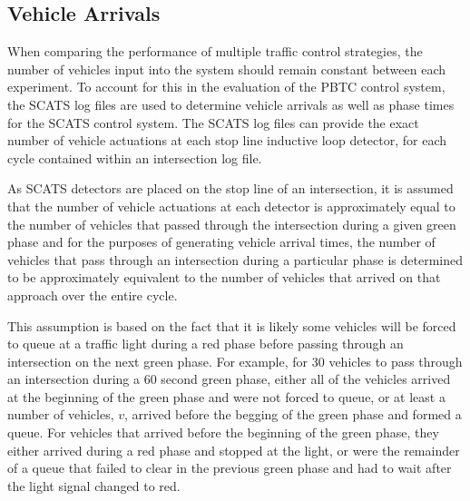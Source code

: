 
\subsection{Vehicle Arrivals}


When comparing the performance of multiple traffic control strategies, the number of vehicles input into the system should remain constant between each experiment. To account for this in the evaluation of the PBTC control system, the SCATS log files are used to determine vehicle arrivals as well as phase times for the SCATS control system. The SCATS log files can provide the exact number of vehicle actuations at each stop line inductive loop detector, for each cycle contained within an intersection log file. 

As SCATS detectors are placed on the stop line of an intersection, it is assumed that the number of vehicle actuations at each detector is approximately equal to the number of vehicles that passed through the intersection during a given green phase and for the purposes of generating vehicle arrival times, the number of vehicles that pass through an intersection during a particular phase is determined to be approximately equivalent to the number of vehicles that arrived on that approach over the entire cycle. 

This assumption is based on the fact that it is likely some vehicles will be forced to queue at a traffic light during a red phase before passing through an intersection on the next green phase. For example, for 30 vehicles to pass through an intersection during a 60 second green phase, either all of the vehicles arrived at the beginning of the green phase and were not forced to queue, or at least a number of vehicles, $v$, arrived before the begging of the green phase and formed a queue. For vehicles that arrived before the beginning of the green phase, they either arrived during a red phase and stopped at the light, or were the remainder of a queue that failed to clear in the previous green phase and had to wait after the light signal changed to red. 

